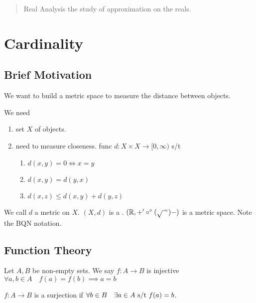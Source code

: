 \documentclass[12pt]{article}
\begin{document}
\maketitle 

\begin{abstract}
  Real Analysis the study of approximation on the reals.
\end{abstract}

\tableofcontents

\pagebreak

\section{Cardinality}
\subsection{Brief Motivation}
We want to build a metric space to measure the distance between objects.

We need
\begin{enumerate}
  \item set $X$ of objects.
  \item need to measure closeness. func \(d:X\times X\to[0,\infty)\) s/t
    \begin{enumerate}
      \item \(d(x,y)=0\iff x=y\)
      \item \(d(x,y)=d(y,x)\)
      \item \(d(x,z)\le d(x,y)+d(y,z)\)
    \end{enumerate}
\end{enumerate}

We call \(d\) a metric on \(X\). \((X,d)\) is a .
\bboxex
\((\mathbb R,+'\circ^\circ(\sqrt{\,}^=)-)\) is a metric space. Note the BQN notation.
\ebox

\subsection{Function Theory}
\bbox
\begin{defn}[Injection] \label{defn:inj}
  Let \(A,B\) be non-empty sets. We say \(f:A\to B\) is injective 
  \(\forall a,b\in A\quad f(a)=f(b)\implies a=b\)
\end{defn}
\ebox

\bbox
\begin{defn}[Surjection] \label{defn:surj}
  \(f:A\to B\) is a surjection if \(\forall b\in B\quad\exists a\in A\text{ s/t } f(a)
  = b\).
\end{defn}
\ebox
\end{document}
